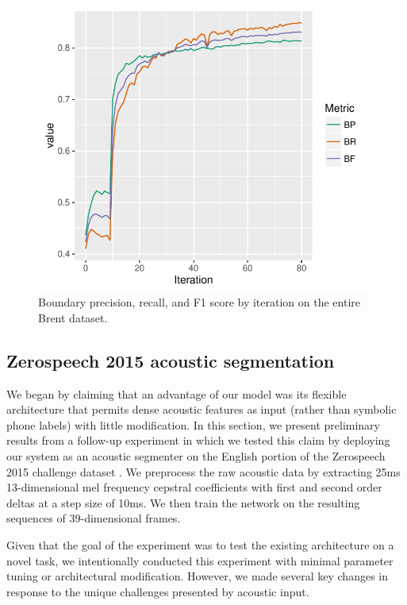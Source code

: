 \documentclass[11pt,letterpaper]{article}
\begin{document}
\begin{figure}
\includegraphics[width=\columnwidth]{learning-curve.pdf}
\caption{Boundary precision, recall, and F1 score by iteration on the
  entire Brent dataset.}
\label{fig-learning-curve}
\end{figure}

\subsection{Zerospeech 2015 acoustic segmentation}

We began by claiming that an advantage of our model was its flexible
architecture that permits dense acoustic features as input (rather
than symbolic phone labels) with little modification.  In this
section, we present preliminary results from a follow-up experiment in
which we tested this claim by deploying our system as an acoustic
segmenter on the English portion of the Zerospeech 2015 challenge
dataset \cite{Versteegh15}.  We preprocess the raw acoustic data by
extracting 25ms 13-dimensional mel frequency cepstral coefficients
with first and second order deltas at a step size of 10ms.  We then
train the network on the resulting sequences of 39-dimensional
frames.

Given that the goal of the experiment was to test the existing architecture on a novel task, we intentionally conducted this experiment with minimal parameter tuning or architectural modification.
However, we made several key changes in response to the unique challenges presented by acoustic input.
\end{document}
